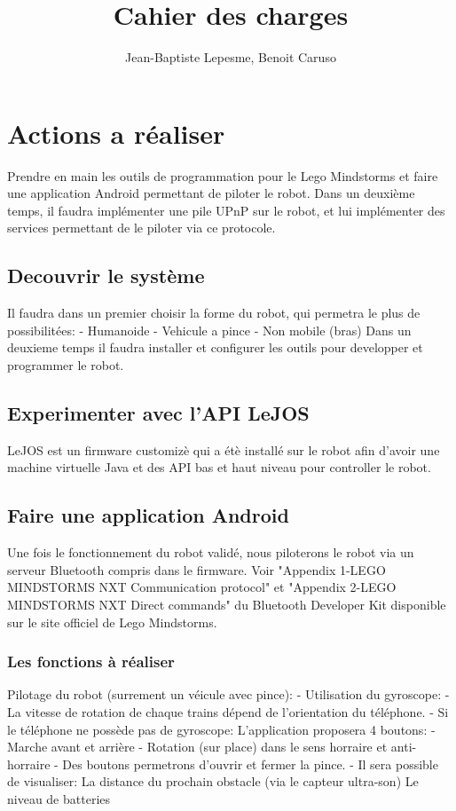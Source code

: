 \documentclass{article}
\title{Cahier des charges}
\author{Jean-Baptiste Lepesme, Benoit Caruso}
\date{}
\begin{document}
	
	\maketitle
	
	\tableofcontents
	
	\newpage
	
	\section{Actions a r\'ealiser}
		Prendre en main les outils de programmation pour le Lego Mindstorms et faire une application Android permettant de piloter le robot.
		Dans un deuxième temps, il faudra implémenter une pile UPnP sur le robot, et lui implémenter des services permettant de le piloter via ce protocole.
		
		
		\subsection{Decouvrir le syst\`eme}
			Il faudra dans un premier choisir la forme du robot, qui permetra le plus de possibilitées:
				- Humanoide
				- Vehicule a pince
				- Non mobile (bras)
			Dans un deuxieme temps il faudra installer et configurer les outils pour developper et programmer le robot.
		\subsection{Experimenter avec l'API LeJOS}
			LeJOS est un firmware customiz\`e qui a \'et\`e install\'e sur le robot afin d'avoir une machine virtuelle Java et des API bas et haut niveau pour controller le robot.
		\subsection{Faire une application Android}
			Une fois le fonctionnement du robot validé, nous piloterons le robot via un serveur Bluetooth compris dans le firmware.
			Voir "Appendix 1-LEGO MINDSTORMS NXT Communication protocol" et "Appendix 2-LEGO MINDSTORMS NXT Direct commands" du Bluetooth Developer Kit disponible sur le site officiel de Lego Mindstorms.
			\subsubsection{Les fonctions \`a r\'ealiser}
				Pilotage du robot (surrement un v\'eicule avec pince):
					- Utilisation du gyroscope:
						- La vitesse de rotation de chaque trains dépend de l'orientation du téléphone.
						- Si le téléphone ne possède pas de gyroscope:
							L'application proposera 4 boutons:
								- Marche avant et arri\`ere
								- Rotation (sur place) dans le sens horraire et anti-horraire
					- Des boutons permetrons d'ouvrir et fermer la pince.
					- Il sera possible de visualiser:
						La distance du prochain obstacle (via le capteur ultra-son)
						Le niveau de batteries
\end{document}
